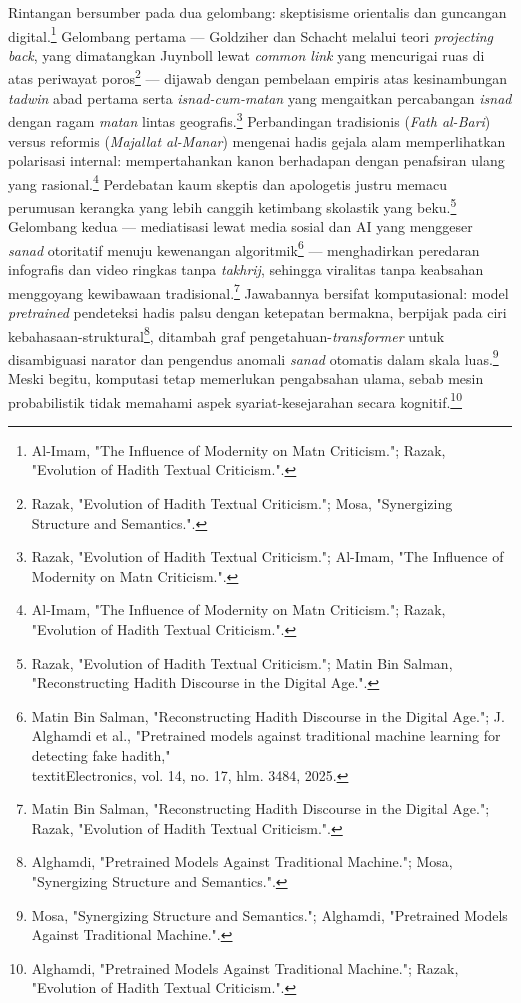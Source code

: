 Rintangan bersumber pada dua gelombang: skeptisisme orientalis dan guncangan digital.\footnote{Al-Imam, "The Influence of Modernity on Matn Criticism."; Razak, "Evolution of Hadith Textual Criticism.".} Gelombang pertama --- Goldziher dan Schacht melalui teori \textit{projecting back}, yang dimatangkan Juynboll lewat \textit{common link} yang mencurigai ruas di atas periwayat poros\footnote{Razak, "Evolution of Hadith Textual Criticism."; Mosa, "Synergizing Structure and Semantics.".} --- dijawab dengan pembelaan empiris atas kesinambungan \textit{tadwin} abad pertama serta \textit{isnad-cum-matan} yang mengaitkan percabangan \textit{isnad} dengan ragam \textit{matan} lintas geografis.\footnote{Razak, "Evolution of Hadith Textual Criticism."; Al-Imam, "The Influence of Modernity on Matn Criticism.".} Perbandingan tradisionis (\textit{Fath al-Bari}) versus reformis (\textit{Majallat al-Manar}) mengenai hadis gejala alam memperlihatkan polarisasi internal: mempertahankan kanon berhadapan dengan penafsiran ulang yang rasional.\footnote{Al-Imam, "The Influence of Modernity on Matn Criticism."; Razak, "Evolution of Hadith Textual Criticism.".} Perdebatan kaum skeptis dan apologetis justru memacu perumusan kerangka yang lebih canggih ketimbang skolastik yang beku.\footnote{Razak, "Evolution of Hadith Textual Criticism."; Matin Bin Salman, "Reconstructing Hadith Discourse in the Digital Age.".} Gelombang kedua --- mediatisasi lewat media sosial dan AI yang menggeser \textit{sanad} otoritatif menuju kewenangan algoritmik\footnote{Matin Bin Salman, "Reconstructing Hadith Discourse in the Digital Age."; J. Alghamdi et al., "Pretrained models against traditional machine learning for detecting fake hadith," \\textit{Electronics}, vol. 14, no. 17, hlm. 3484, 2025.} --- menghadirkan peredaran infografis dan video ringkas tanpa \textit{takhrij}, sehingga viralitas tanpa keabsahan menggoyang kewibawaan tradisional.\footnote{Matin Bin Salman, "Reconstructing Hadith Discourse in the Digital Age."; Razak, "Evolution of Hadith Textual Criticism.".} Jawabannya bersifat komputasional: model \textit{pretrained} pendeteksi hadis palsu dengan ketepatan bermakna, berpijak pada ciri kebahasaan-struktural\footnote{Alghamdi, "Pretrained Models Against Traditional Machine."; Mosa, "Synergizing Structure and Semantics.".}, ditambah graf pengetahuan-\textit{transformer} untuk disambiguasi narator dan pengendus anomali \textit{sanad} otomatis dalam skala luas.\footnote{Mosa, "Synergizing Structure and Semantics."; Alghamdi, "Pretrained Models Against Traditional Machine.".} Meski begitu, komputasi tetap memerlukan pengabsahan ulama, sebab mesin probabilistik tidak memahami aspek syariat-kesejarahan secara kognitif.\footnote{Alghamdi, "Pretrained Models Against Traditional Machine."; Razak, "Evolution of Hadith Textual Criticism.".}

